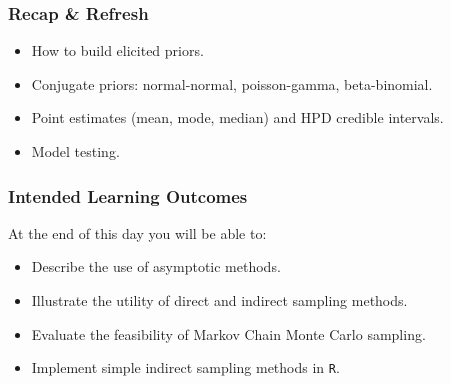 \documentclass{beamer}
\newcommand{\1}{\ensuremath{\mathbf{1}}}
\begin{document}
%
%
%
\begin{frame}\frametitle{Recap \& Refresh}
	\begin{itemize}
		\item How to build elicited priors.
		\item Conjugate priors: normal-normal, poisson-gamma, beta-binomial.
		\item Point estimates (mean, mode, median) and HPD credible intervals.
		\item Model testing.
	\end{itemize}
\end{frame}
%
%
%
\begin{frame}\frametitle{Intended Learning Outcomes}
	At the end of this day you will be able to:
	\begin{itemize}
		\item Describe the use of asymptotic methods.
		\item Illustrate the utility of direct and indirect sampling methods.
		\item Evaluate the feasibility of Markov Chain Monte Carlo sampling.
		\item Implement simple indirect sampling methods in \texttt{R}.
	\end{itemize}
\end{frame}
\end{document}

